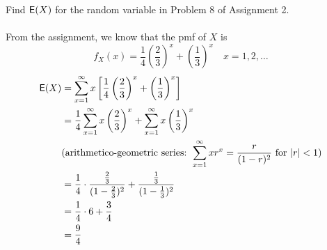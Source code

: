 \documentclass[12pt]{article}
\newcommand{\E}{{\sf E}}
\newenvironment{problem}[2][Problem]{\begin{trivlist}
\item[\hskip \labelsep {\bfseries #1}\hskip \labelsep {\bfseries #2.}]}
{\end{trivlist}}
\begin{document}
\begin{problem}{2}
  Find $\E(X)$ for the random variable in Problem 8 of Assignment 2.
  \\\\
  From the assignment, we know that the pmf of $X$ is
  \[
    f_X(x) = \frac14 \left(\frac23\right)^x + \left(\frac13\right)^x
    \quad x = 1, 2, \ldots
  \]
  \[
    \begin{aligned}
      \E(X) &= \sum_{x=1}^{\infty} x \left[ \frac14 \left(\frac23\right)^x
      + \left(\frac13\right)^x \right] \\
      &= \frac14 \sum_{x=1}^{\infty} x \left(\frac23\right)^x
      + \sum_{x=1}^{\infty} x \left(\frac13\right)^x \\
      &(\text{arithmetico-geometric series: } \sum_{x=1}^{\infty} xr^x = 
      \frac{r}{(1-r)^2} \text{ for }|r| < 1)\\
      &= \frac14 \cdot \frac{\frac23}{(1-\frac23)^2} 
      + \frac{\frac13}{(1-\frac13)^2} \\
      &= \frac14 \cdot 6 + \frac34\\
      &= \frac{9}{4}
    \end{aligned}
  \]
\end{problem}
\end{document}
